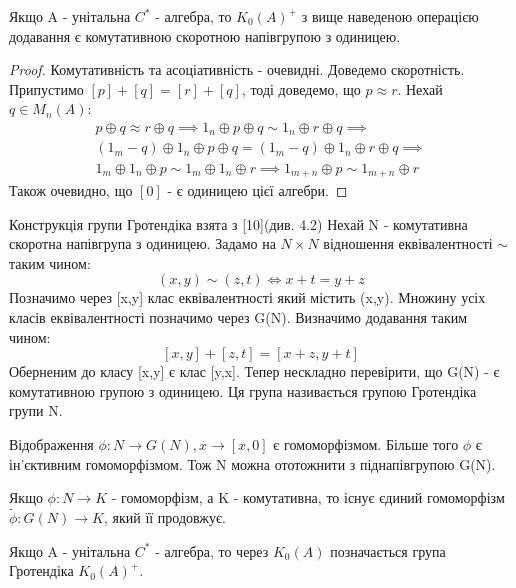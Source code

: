 \begin{theorem}
    Якщо A - унітальна $C^*$ - алгебра, то $K_0(A)^+$ з вище наведеною операцією
    додавання є комутативною скоротною напівгрупою з одиницею.
    \begin{proof}
        Комутативність та асоціативність - очевидні.
        Доведемо скоротність.
        Припустимо $[p] + [q] = [r] + [q]$, тоді доведемо, що $p \approx r$.
        Нехай $q \in M_n(A)$:
        \begin{align*}
            p \oplus q \approx r \oplus q \implies 1_n \oplus p \oplus q \sim 1_n \oplus r \oplus q \implies \\
            (1_m - q) \oplus 1_n \oplus p \oplus q = (1_m - q) \oplus 1_n \oplus r \oplus q \implies \\
            1_m \oplus 1_n \oplus p \sim 1_m \oplus 1_n \oplus r \implies 1_{m+n} \oplus p \sim 1_{m+n} \oplus r
        \end{align*}
        Також очевидно, що $[0]$ - є одиницею цієї алгебри.
    \end{proof}
\end{theorem}

Конструкція групи Гротендіка взята з [10](див. 4.2)
Нехай N - комутативна скоротна напівгрупа з одиницею.
Задамо на $N \times N$ відношення еквівалентності $\sim$ таким чином:
\[
    (x,y) \sim (z, t) \iff  x + t = y + z
\]
Позначимо через [x,y] клас еквівалентності який містить (x,y).
Множину усіх класів еквівалентності позначимо через G(N).
Визначимо додавання таким чином:
\[
    [x,y] + [z,t] = [x+z, y+t]
\]
Оберненим до класу [x,y] є клас [y,x].
Тепер нескладно перевірити, що G(N) - є комутативною групою з одиницею.
Ця група називається групою Гротендіка групи N.

Відображення $\phi: N \rightarrow G(N), x \rightarrow [x,0]$ є гомоморфізмом.
Більше того $\phi$ є ін'єктивним гомоморфізмом.
Тож N можна ототожнити з піднапівгрупою G(N).

Якщо $\phi: N \rightarrow K$ - гомоморфізм, а K - комутативна,
то існує єдиний гомоморфізм $\widetilde{\phi}: G(N) \rightarrow K$, який її продовжує.

Якщо A - унітальна $C^*$ - алгебра, то через $K_0(A)$ позначається група \\
Гротендіка $K_0(A)^+$.

